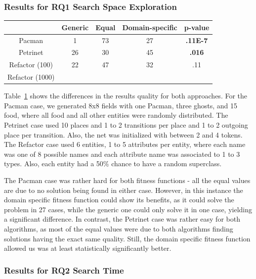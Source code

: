 

\subsubsection{Results for RQ1 Search Space Exploration}

\begin{table}
\begin{tabular}{|c|c|c|c|c|}
\hline
 & Generic & Equal & Domain-specific & p-value \\
\hline
Pacman & 1 & 73 & 27 & \textbf{.11E-7} \\
\hline
Petrinet & 26 & 30 & 45 & \textbf{.016} \\
\hline
Refactor (100) & 22 & 47 & 32 & .11 \\
\hline
Refactor (1000) & & & & \\
\hline
\end{tabular}
\label{tab:resultsrq1}
\end{table}

Table~\ref{tab:resultsrq1} shows the differences in the results quality for both approaches. For the Pacman case, we generated 8x8 fields with one Pacman, three ghosts, and 15 food, where all food and all other entities were randomly distributed. The Petrinet case used 10 places and 1 to 2 transitions per place and 1 to 2 outgoing place per transition. Also, the net was initialized with between 2 and 4 tokens. The Refactor case used 6 entities, 1 to 5 attributes per entity, where each name was one of 8 possible names and each attribute name was associated to 1 to 3 types. Also, each entity had a 50\% chance to have a random superclass. 

The Pacman case was rather hard for both fitness functions - all the equal values are due to no solution being found in either case. However, in this instance the domain specific fitness function could show its benefits, as it could solve the problem in 27 cases, while the generic one could only solve it in one case, yielding a significant difference. In contrast, the Petrinet case was rather easy for both algorithms, as most of the equal values were due to both algorithms finding solutions having the exact same quality. Still, the domain specific fitness function allowed us was at least statistically significantly better.


\subsubsection{Results for RQ2 Search Time}

